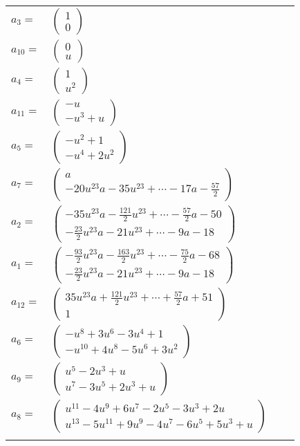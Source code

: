 \documentclass[1p]{elsarticle_modified}
\theoremstyle{definition}
\begin{document}
\begin{tabular}{m{7pt} m{180pt} m{7pt} m{180pt} }
\flushright $a_{3}=$&$\begin{pmatrix}1\\0\end{pmatrix}$ \\
\flushright $a_{10}=$&$\begin{pmatrix}0\\u\end{pmatrix}$ \\
\flushright $a_{4}=$&$\begin{pmatrix}1\\u^2\end{pmatrix}$ \\
\flushright $a_{11}=$&$\begin{pmatrix}- u\\- u^3+u\end{pmatrix}$ \\
\flushright $a_{5}=$&$\begin{pmatrix}- u^2+1\\- u^4+2 u^2\end{pmatrix}$ \\
\flushright $a_{7}=$&$\begin{pmatrix}a\\-20 u^{23} a-35 u^{23}+\cdots-17 a-\frac{57}{2}\end{pmatrix}$ \\
\flushright $a_{2}=$&$\begin{pmatrix}-35 u^{23} a-\frac{121}{2} u^{23}+\cdots-\frac{57}{2} a-50\\-\frac{23}{2} u^{23} a-21 u^{23}+\cdots-9 a-18\end{pmatrix}$ \\
\flushright $a_{1}=$&$\begin{pmatrix}-\frac{93}{2} u^{23} a-\frac{163}{2} u^{23}+\cdots-\frac{75}{2} a-68\\-\frac{23}{2} u^{23} a-21 u^{23}+\cdots-9 a-18\end{pmatrix}$ \\
\flushright $a_{12}=$&$\begin{pmatrix}35 u^{23} a+\frac{121}{2} u^{23}+\cdots+\frac{57}{2} a+51\\1\end{pmatrix}$ \\
\flushright $a_{6}=$&$\begin{pmatrix}- u^8+3 u^6-3 u^4+1\\- u^{10}+4 u^8-5 u^6+3 u^2\end{pmatrix}$ \\
\flushright $a_{9}=$&$\begin{pmatrix}u^5-2 u^3+u\\u^7-3 u^5+2 u^3+u\end{pmatrix}$ \\
\flushright $a_{8}=$&$\begin{pmatrix}u^{11}-4 u^9+6 u^7-2 u^5-3 u^3+2 u\\u^{13}-5 u^{11}+9 u^9-4 u^7-6 u^5+5 u^3+u\end{pmatrix}$\\&\end{tabular}
\end{document}
